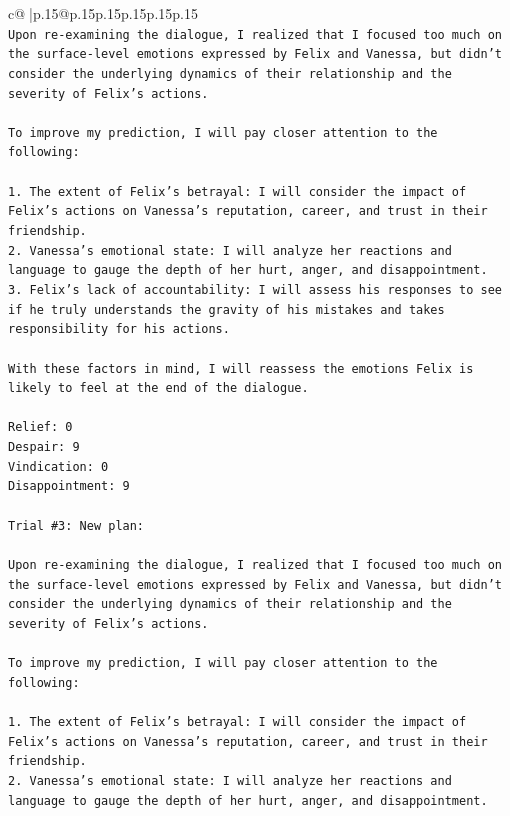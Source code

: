 \documentclass{article}
\begin{document}
{\begin{supertabular}{c@{$\;$}|p{.15\linewidth}@{}p{.15\linewidth}p{.15\linewidth}p{.15\linewidth}p{.15\linewidth}p{.15\linewidth}}
{{{\\ 
\texttt{Upon re{-}examining the dialogue, I realized that I focused too much on the surface{-}level emotions expressed by Felix and Vanessa, but didn't consider the underlying dynamics of their relationship and the severity of Felix's actions. } \\
\\ 
\texttt{To improve my prediction, I will pay closer attention to the following:} \\
\\ 
\texttt{1. The extent of Felix's betrayal: I will consider the impact of Felix's actions on Vanessa's reputation, career, and trust in their friendship.} \\
\texttt{2. Vanessa's emotional state: I will analyze her reactions and language to gauge the depth of her hurt, anger, and disappointment.} \\
\texttt{3. Felix's lack of accountability: I will assess his responses to see if he truly understands the gravity of his mistakes and takes responsibility for his actions.} \\
\\ 
\texttt{With these factors in mind, I will reassess the emotions Felix is likely to feel at the end of the dialogue.} \\
\\ 
\texttt{Relief: 0} \\
\texttt{Despair: 9} \\
\texttt{Vindication: 0} \\
\texttt{Disappointment: 9} \\
\\ 
\texttt{Trial \#3: New plan: } \\
\\ 
\texttt{Upon re{-}examining the dialogue, I realized that I focused too much on the surface{-}level emotions expressed by Felix and Vanessa, but didn't consider the underlying dynamics of their relationship and the severity of Felix's actions. } \\
\\ 
\texttt{To improve my prediction, I will pay closer attention to the following:} \\
\\ 
\texttt{1. The extent of Felix's betrayal: I will consider the impact of Felix's actions on Vanessa's reputation, career, and trust in their friendship.} \\
\texttt{2. Vanessa's emotional state: I will analyze her reactions and language to gauge the depth of her hurt, anger, and disappointment.} \\
}}}
\end{supertabular}}
\end{document}
